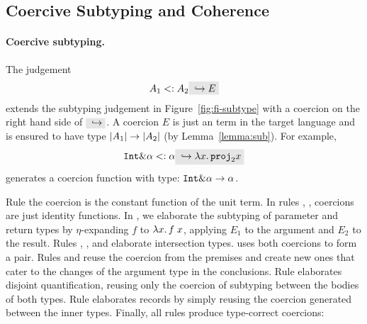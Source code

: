 \subsection{Coercive Subtyping and Coherence}

\paragraph{Coercive subtyping.}

The judgement
\[
A_1 \subtype A_2 \yields E
\]
extends the subtyping judgement in Figure~\ref{fig:fi-subtype} with a coercion
on the right hand side of $ \yields {} $. A coercion $ E $ is just an term
in the target language and is ensured to have type
$ \im {A_1} \to \im {A_2} $ (by Lemma~\ref{lemma:sub}). For example,
\[
\tyint \inter \alpha \subtype \alpha \yields {\lamty x {\im {\tyint \inter \tybool}} {\proj 2 x}}
\]
generates a coercion function with type: $\tyint \inter \alpha \to \alpha$.

Rule  the coercion is the constant function of the unit term.
In rules , , coercions are just
identity functions. 
In , we elaborate the subtyping of
parameter and return types by $\eta$-expanding $f$ to $\lamty x {\im {A_3}}
{\app f x}$, applying $E_1$ to the argument and $E_2$ to the result. 
Rules , , and
 elaborate intersection types.
 uses both coercions to form a pair. 
Rules  and  reuse the coercion
from the premises and create new ones that cater to the changes of the argument
type in the conclusions. 
Rule  elaborates disjoint quantification, reusing only the coercion of 
subtyping between the bodies of both types. 
Rule  elaborates records by simply reusing the coercion generated between
the inner types.
Finally, all rules produce type-correct coercions:



